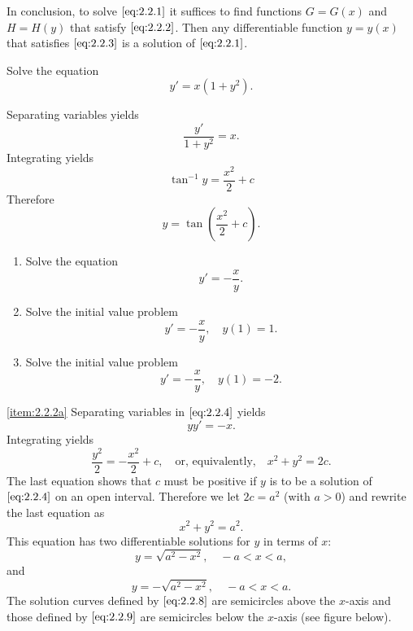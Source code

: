 \documentclass{ximera}
\begin{document}
In conclusion, to solve $\eqref{eq:2.2.1}$ it suffices to find
functions $G=G(x)$ and $H=H(y)$ that satisfy $\eqref{eq:2.2.2}$.
Then any differentiable function  $y=y(x)$  that satisfies
$\eqref{eq:2.2.3}$ is a solution of $\eqref{eq:2.2.1}$.
 
\begin{example}\label{example:2.2.1}
Solve the equation
$$
y'=x(1+y^2).
$$
\begin{explanation}
Separating variables
yields
$$
\frac{y'}{1+y^2}=x.
$$
Integrating yields
$$
\tan^{-1}y=\frac{x^2}{2}+c
$$
Therefore
$$
y=\tan\left(\frac{x^2}{2}+c\right).
$$
\end{explanation}
\end{example}
 
\begin{example}\label{example:2.2.2}
\begin{enumerate}
\item\label{item:2.2.2a}
Solve the equation
\begin{equation} \label{eq:2.2.4}
y'=-\frac{x}{y}.
\end{equation}
 
\item\label{item:2.2.2b}
Solve the initial value problem
\begin{equation} \label{eq:2.2.5}
y'=-\frac{x}{y}, \quad y(1)=1.
\end{equation}
 
\item \label{item:2.2.2c}
Solve the initial value problem
\begin{equation} \label{eq:2.2.6}
y'=-\frac{x}{y}, \quad y(1)=-2.
\end{equation}
\end{enumerate}
 
\begin{explanation}
\ref{item:2.2.2a} Separating variables
in $\eqref{eq:2.2.4}$  yields
$$
yy'=-x.
$$
Integrating yields
$$
\frac{y^2}{2}=-\frac{x^2}{2}+c,\quad\text{or, equivalently,}\quad
x^2+y^2=2c.
$$
The last equation shows that $c$ must be positive if $y$ is to be a
solution of $\eqref{eq:2.2.4}$ on an open interval. Therefore we let
$2c=a^2$ (with $a > 0$) and rewrite the last equation as
\begin{equation} \label{eq:2.2.7}
x^2+y^2=a^2.
\end{equation}
 This equation has two differentiable solutions for $y$ in terms of
$x$:
\begin{equation} \label{eq:2.2.8}
y=\sqrt{a^2-x^2}, \quad -a < x < a,
\end{equation}
 and
\begin{equation} \label{eq:2.2.9}
y= - \sqrt{a^2-x^2}, \quad -a < x < a.
\end{equation}
The solution curves defined by $\eqref{eq:2.2.8}$  are semicircles
above the
$x$-axis and  those defined by $\eqref{eq:2.2.9}$  are semicircles below the
$x$-axis (see figure below).
 

\end{explanation}
\end{example}
\end{document}
